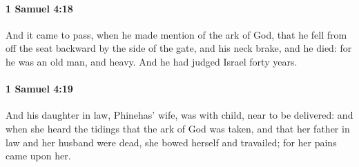		\paragraph{1 Samuel 4:18} %
			\label{1SAMUEL-4-18}

			And it came to pass, when he made mention of the ark of God, that he fell from off the seat backward by the side of the gate, and his neck brake, and he died: for he was an old man, and heavy. And he had judged Israel forty years.


		\paragraph{1 Samuel 4:19} %
			\label{1SAMUEL-4-19}

			And his daughter in law, Phinehas’ wife, was with child, near to be delivered: and when she heard the tidings that the ark of God was taken, and that her father in law and her husband were dead, she bowed herself and travailed; for her pains came upon her.

